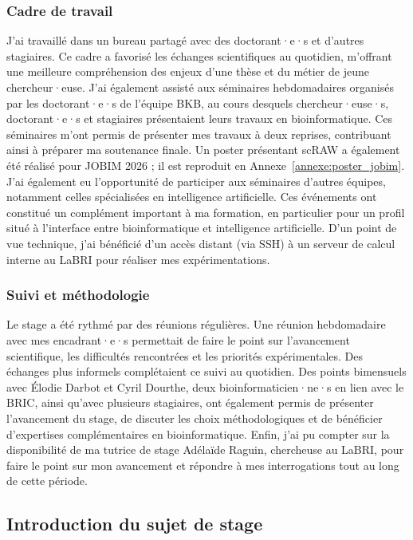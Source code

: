\subsubsection*{Cadre de travail}
J'ai travaillé dans un bureau partagé avec des doctorant·e·s et d'autres stagiaires. Ce cadre a favorisé les échanges scientifiques au quotidien, m'offrant une meilleure compréhension des enjeux d'une thèse et du métier de jeune chercheur·euse. J'ai également assisté aux séminaires hebdomadaires organisés par les doctorant·e·s de l'équipe BKB, au cours desquels chercheur·euse·s, doctorant·e·s et stagiaires présentaient leurs travaux en bioinformatique. Ces séminaires m'ont permis de présenter mes travaux à deux reprises, contribuant ainsi à préparer ma soutenance finale. Un poster présentant scRAW a également été réalisé pour JOBIM 2026 ; il est reproduit en Annexe~\ref{annexe:poster_jobim}. J'ai également eu l'opportunité de participer aux séminaires d'autres équipes, notamment celles spécialisées en intelligence artificielle. Ces événements ont constitué un complément important à ma formation, en particulier pour un profil situé à l'interface entre bioinformatique et intelligence artificielle. D'un point de vue technique, j'ai bénéficié d'un accès distant (via SSH) à un serveur de calcul interne au LaBRI pour réaliser mes expérimentations.

\subsubsection*{Suivi et méthodologie}
Le stage a été rythmé par des réunions régulières. Une réunion hebdomadaire avec mes encadrant·e·s permettait de faire le point sur l'avancement scientifique, les difficultés rencontrées et les priorités expérimentales. Des échanges plus informels complétaient ce suivi au quotidien. Des points bimensuels avec Élodie Darbot et Cyril Dourthe, deux bioinformaticien·ne·s en lien avec le BRIC, ainsi qu'avec plusieurs stagiaires, ont également permis de présenter l'avancement du stage, de discuter les choix méthodologiques et de bénéficier d'expertises complémentaires en bioinformatique. Enfin, j'ai pu compter sur la disponibilité de ma tutrice de stage Adélaïde Raguin, chercheuse au LaBRI, pour faire le point sur mon avancement et répondre à mes interrogations tout au long de cette période.

\subsection{Introduction du sujet de stage}

